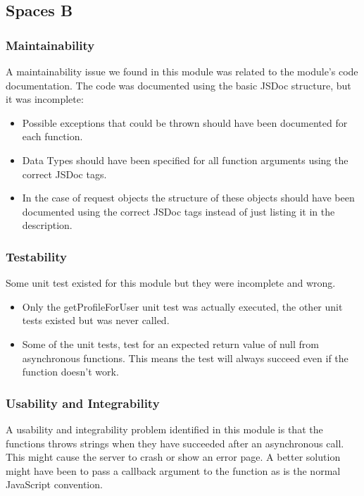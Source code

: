 \subsection{Spaces B}

\subsubsection{Maintainability}

A maintainability issue we found in this module was related to the module's code documentation. The code was documented using the basic JSDoc structure, but it was incomplete:
	\begin{itemize}
		\item  Possible exceptions that could be thrown should have been documented for each function.
		\item Data Types should have been specified for all function arguments using the correct JSDoc tags.
		\item In the case of request objects the structure of these objects should have been documented using the correct JSDoc tags instead of just listing it in the description.
	\end{itemize}

\subsubsection{Testability}
Some unit test existed for this module but they were incomplete and wrong.
\begin{itemize}
\item Only the getProfileForUser unit test was actually executed, the other unit tests existed but was never called.
\item Some of the unit tests, test for an expected return value of null from asynchronous functions. This means the test will always succeed even if the function doesn't work.
\end{itemize}

\subsubsection{Usability and Integrability}
A usability and integrability problem identified in this module is that the functions throws  strings when they have succeeded after an asynchronous call. This might cause the server to crash or show an error page. A better solution might have been to pass a callback argument to the function as is the normal JavaScript convention.

